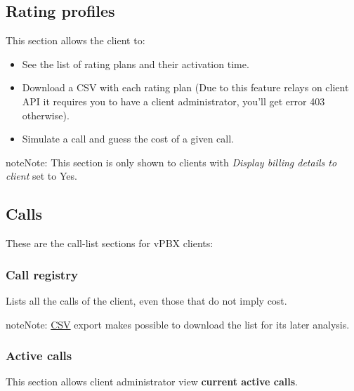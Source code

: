 \documentclass[letterpaper,10pt,english]{sphinxmanual}
\begin{document}
\subsection{Rating profiles}
\label{administration_portal/client/vpbx/rating_profiles:rating-profiles}\label{administration_portal/client/vpbx/rating_profiles::doc}
This section allows the client to:
\begin{itemize}
\item {} 
See the list of rating plans and their activation time.

\item {} 
Download a CSV with each rating plan (Due to this feature relays on client API it requires you to have a client administrator, you'll get error 403 otherwise).

\item {} 
Simulate a call and guess the cost of a given call.

\end{itemize}

\begin{notice}{note}{Note:}
This section is only shown to clients with \emph{Display billing details to client} set to Yes.
\end{notice}


\subsection{Calls}
\label{administration_portal/client/vpbx/calls/index::doc}\label{administration_portal/client/vpbx/calls/index:calls}
These are the call-list sections for vPBX clients:


\subsubsection{Call registry}
\label{administration_portal/client/vpbx/calls/call_registry::doc}\label{administration_portal/client/vpbx/calls/call_registry:call-registry}\label{administration_portal/client/vpbx/calls/call_registry:id1}
Lists all the calls of the client, even those that do not imply cost.

\begin{notice}{note}{Note:}
\href{https://es.wikipedia.org/wiki/CSV}{CSV} export makes possible to
download the list for its later analysis.
\end{notice}


\subsubsection{Active calls}
\label{administration_portal/client/vpbx/calls/active_calls::doc}\label{administration_portal/client/vpbx/calls/active_calls:active-calls}
This section allows client administrator view \textbf{current active calls}.
\end{document}

